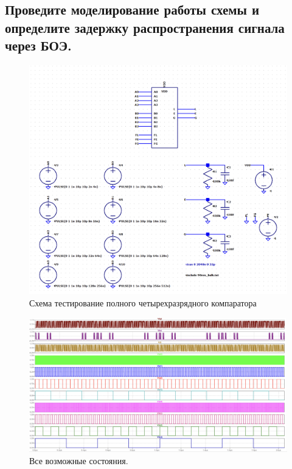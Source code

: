 \documentclass[12pt,onecolumn]{article}
\begin{document}
\subsection{Проведите моделирование работы схемы и определите задержку распространения сигнала через БОЭ.}
\begin{figure}[H]
    \centering
    \includegraphics[width=\textwidth]{image/full-comparator-test-env.png}
    \caption{Схема тестирование полного четырехразрядного компаратора}
\end{figure}
\begin{figure}[H]
    \centering
    \includegraphics[width=\textwidth]{image/full-comparator-test-all-states.png}
    \caption{Все возможные состояния.}
\end{figure}
\end{document}
